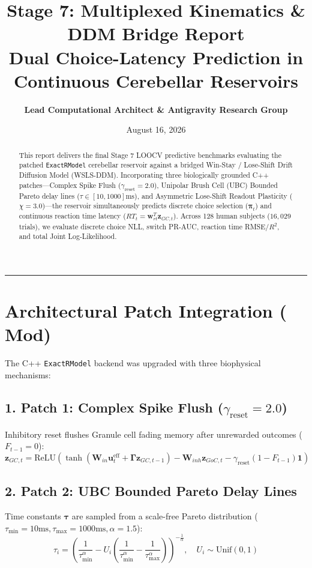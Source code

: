 \documentclass[11pt,a4paper]{article}
\title{\Huge \textbf{\color{navyblue} Stage 7: Multiplexed Kinematics \& DDM Bridge Report}\\[0.4em]
\large Dual Choice-Latency Prediction in Continuous Cerebellar Reservoirs}
\author{\textbf{Lead Computational Architect \& Antigravity Research Group}}
\date{August 16, 2026}
\begin{document}
\maketitle

\begin{abstract}
This report delivers the final Stage 7 LOOCV predictive benchmarks evaluating the patched \texttt{ExactRModel} cerebellar reservoir against a bridged Win-Stay / Lose-Shift Drift Diffusion Model (WSLS-DDM). Incorporating three biologically grounded C++ patches---Complex Spike Flush ($\gamma_{\text{reset}} = 2.0$), Unipolar Brush Cell (UBC) Bounded Pareto delay lines ($\tau \in [10, 1000]\text{ms}$), and Asymmetric Lose-Shift Readout Plasticity ($\chi = 3.0$)---the reservoir simultaneously predicts discrete choice selection ($\boldsymbol{\pi}_t$) and continuous reaction time latency ($RT_t = \mathbf{w}_{rt}^T \mathbf{z}_{GC,t}$). Across 128 human subjects ($16,029$ trials), we evaluate discrete choice NLL, switch PR-AUC, reaction time RMSE/$R^2$, and total Joint Log-Likelihood.
\end{abstract}

\vspace{0.8em}
\hrule
\vspace{0.8em}

\section{Architectural Patch Integration ($\mathbf{Mod}$)}

The C++ \texttt{ExactRModel} backend was upgraded with three biophysical mechanisms:

\subsection{1. Patch 1: Complex Spike Flush ($\gamma_{\text{reset}} = 2.0$)}
Inhibitory reset flushes Granule cell fading memory after unrewarded outcomes ($F_{t-1} = 0$):
\begin{equation}
\mathbf{z}_{GC,t} = \text{ReLU}\left( \tanh\left(\mathbf{W}_{in}\mathbf{u}_t^{\text{eff}} + \boldsymbol{\Gamma}\mathbf{z}_{GC,t-1}\right) - \mathbf{W}_{inh}\mathbf{z}_{GoC,t} - \gamma_{\text{reset}} (1 - F_{t-1}) \mathbf{1} \right)
\end{equation}

\subsection{2. Patch 2: UBC Bounded Pareto Delay Lines}
Time constants $\boldsymbol{\tau}$ are sampled from a scale-free Pareto distribution ($\tau_{\min} = 10\text{ms}, \tau_{\max} = 1000\text{ms}, \alpha = 1.5$):
\begin{equation}
\tau_i = \left( \frac{1}{\tau_{\min}^\alpha} - U_i \left( \frac{1}{\tau_{\min}^\alpha} - \frac{1}{\tau_{\max}^\alpha} \right) \right)^{-\frac{1}{\alpha}}, \quad U_i \sim \text{Unif}(0, 1)
\end{equation}
\end{document}

